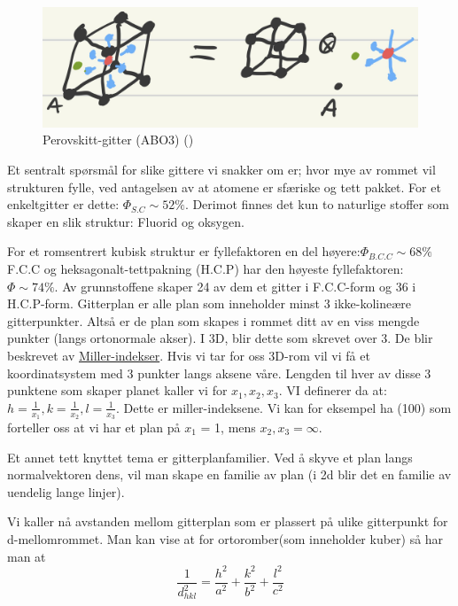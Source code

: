 \documentclass{article}
\begin{document}
\begin{figure}[H]
    \centering
    \includegraphics[width=0.5\linewidth]{bilder/perovskitt_gitter.png}
    \caption{Perovskitt-gitter (ABO3) (\cite{Sebastian})}
    \label{fig:perovskitt_gitter}
\end{figure}
Et sentralt spørsmål for slike gittere vi snakker om er; hvor mye av rommet vil strukturen fylle, ved antagelsen av at atomene er sfæriske og tett pakket. For et enkeltgitter er dette: $\Phi_{S.C} \sim 52\%$. Derimot finnes det kun to naturlige stoffer som skaper en slik struktur: Fluorid og oksygen.

For et romsentrert kubisk struktur er fyllefaktoren en del høyere:$\Phi_{B.C.C} \sim 68\%$
F.C.C og heksagonalt-tettpakning (H.C.P) har den høyeste fyllefaktoren: $\Phi \sim 74\%$. Av grunnstoffene skaper 24 av dem et gitter i F.C.C-form og 36 i H.C.P-form.
Gitterplan er alle plan som inneholder minst 3 ikke-kolineære gitterpunkter. Altså er de plan som skapes i rommet ditt av en viss mengde punkter (langs ortonormale akser). I 3D, blir dette som skrevet over 3. De blir beskrevet av \underline{Miller-indekser}.
Hvis vi tar for oss 3D-rom vil vi få et koordinatsystem med 3 punkter langs aksene våre. Lengden til hver av disse 3 punktene som skaper planet kaller vi for $x_1, x_2, x_3$. VI definerer da at: $h = \frac{1}{x_1}, k = \frac{1}{x_2},l = \frac{1}{x_3}$. Dette er miller-indeksene. Vi kan for eksempel ha (100) som forteller oss at vi har et plan på $x_1$ = 1, mens $x_2, x_3 = \infty$.

Et annet tett knyttet tema er gitterplanfamilier. Ved å skyve et plan langs normalvektoren dens, vil man skape en familie av plan (i 2d blir det en familie av uendelig lange linjer).

Vi kaller nå avstanden mellom gitterplan som er plassert på ulike gitterpunkt for d-mellomrommet. Man kan vise at for ortoromber(som inneholder kuber) så har man at
\begin{equation}
    \frac{1}{d^{2}_{hkl}} = \frac{h^2}{a^2} + \frac{k^2}{b^2} + \frac{l^2}{c^2}
\end{equation}
\end{document}
